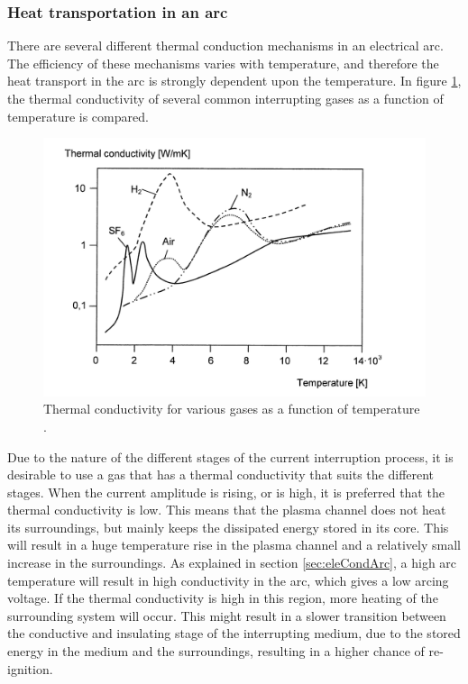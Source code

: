\documentclass[10pt,b5paper,twoside]{article}
\begin{document}
\subsubsection{Heat transportation in an arc} \label{sec:HeatTransport}
There are several different thermal conduction mechanisms in an electrical arc. The efficiency of these mechanisms varies with temperature, and therefore the heat transport in the arc is strongly dependent upon the temperature. In figure \ref{fig:tempConGas}, the thermal conductivity of several common interrupting gases as a function of temperature is compared.

\begin{figure}[H]
\centering
\includegraphics[scale=0.83]{Bilder/Theory/thermalCond.png}
\caption{Thermal conductivity for various gases as a function of temperature \cite{bib:HVEbreak}.} \label{fig:tempConGas}
\end{figure}

Due to the nature of the different stages of the current interruption process, it is desirable to use a gas that has a thermal conductivity that suits the different stages. When the current amplitude is rising, or is high, it is preferred that the thermal conductivity is low. This means that the plasma channel does not heat its surroundings, but mainly keeps the dissipated energy stored in its core. This will result in a huge temperature rise in the plasma channel and a relatively small increase in the surroundings. As explained in section \ref{sec:eleCondArc}, a high arc temperature will result in high conductivity in the arc, which gives a low arcing voltage. If the thermal conductivity is high in this region, more heating of the surrounding system will occur. This might result in a slower transition between the conductive and insulating stage of the interrupting medium, due to the stored energy in the medium and the surroundings, resulting in a higher chance of re-ignition.
\end{document}
